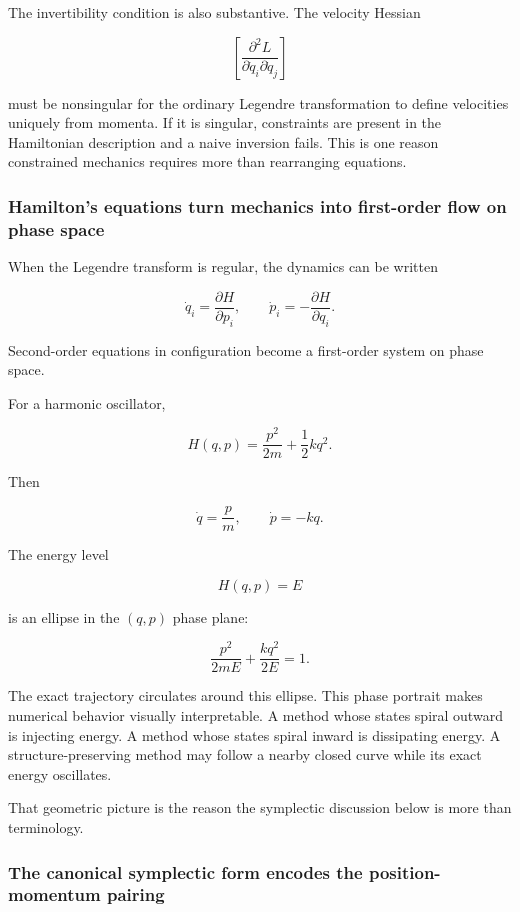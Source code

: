 The invertibility condition is also substantive. The velocity Hessian

\[
\left[
\frac{\partial^2L}
{\partial\dot q_i\partial\dot q_j}
\right]
\]

must be nonsingular for the ordinary Legendre transformation to define velocities uniquely from momenta. If it is singular, constraints are present in the Hamiltonian description and a naive inversion fails. This is one reason constrained mechanics requires more than rearranging equations.

\subsubsection{Hamilton's equations turn mechanics into first-order flow on phase space}\label{02-foundations-ii-ch025-hamiltons-equations-turn-mechanics-into-first-order-flow-on-phase-space}

When the Legendre transform is regular, the dynamics can be written

\[
\boxed{
\dot q_i
=
\frac{\partial H}{\partial p_i},
\qquad
\dot p_i
=
-
\frac{\partial H}{\partial q_i}
}.
\]

Second-order equations in configuration become a first-order system on phase space.

For a harmonic oscillator,

\[
H(q,p)
=
\frac{p^2}{2m}
+
\frac12kq^2.
\]

Then

\[
\dot q=\frac pm,
\qquad
\dot p=-kq.
\]

The energy level

\[
H(q,p)=E
\]

is an ellipse in the \((q,p)\) phase plane:

\[
\frac{p^2}{2mE}
+
\frac{kq^2}{2E}
=
1.
\]

The exact trajectory circulates around this ellipse. This phase portrait makes numerical behavior visually interpretable. A method whose states spiral outward is injecting energy. A method whose states spiral inward is dissipating energy. A structure-preserving method may follow a nearby closed curve while its exact energy oscillates.

That geometric picture is the reason the symplectic discussion below is more than terminology.

\subsubsection{The canonical symplectic form encodes the position-momentum pairing}\label{02-foundations-ii-ch025-the-canonical-symplectic-form-encodes-the-position-momentum-pairing}

